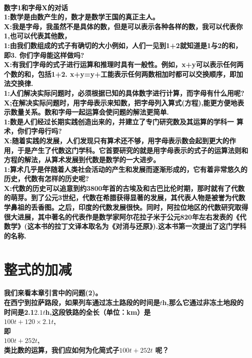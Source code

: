 \documentclass[UTF8]{report}
\theoremstyle{definition}
\theoremstyle{remark}
\begin{document}
\paragraph{数字1和字母X的对话\\1:数学是由数产生的，数才是数学王国的真正主人。\\X:我是字母，我虽然不是具体的数，但是可以表示各种各样的数，我可以代表你1,也可以代表其他数，\\1:由我们数组成的式子有确切的大小例如，人们一见到1+2就知道是1与2的和，即3. 你们字母能这样做吗?\\X:有我们字母的式子进行运算和推理时具有一般性。例如，x+y可以表示任何两个数的和，包括1+2. x+y=y+工能表示任何两数相加时都可以交换顺序，即加法交换律.\\1:人们解决实际问题时，必须根据已知的具体数字进行计算，而字母有什么用呢?X;在解决实际问题时，用字母表示来知数，把字母列入算式(方程),能更方便地表示数量关系。数和字母一起运算会使问题的解法更简单.\\1:数是人们经过长期实践创造出来的，并建立了专门研究数及其运算的学科一 算术，你们字母行吗?\\X:随着实践的发展，人们发现只有算术还不够，用字母表示数会起到更大的作用，于是产生了代数这门学科。它首要研究的就是用字母表示的式子的运算法则和方程的解法，从算术发展到代数是数学的一大进步。\\1:算术几乎是伴随着人类社会活动的产生和发展而逐渐形成的，它有着非常悠久的历史，代数有怎样的历史呢?\\X:代数的历史可以追意到约3800年首的古埃及和古巴比伦时期，那时就有了代数的萌芽。到了公元3世纪，代数在希腊获得显著的发展，其代表人物是被誉为代数学鼻祖的丢香图。之后，印度的代数发展很快。同时，阿拉位地区的代数研究取得很大进展，其中著名的代表作是数学家阿尔花拉子米于公元820年左右发表的《代数学》(这本书的拉丁文译本取名为《对消与还原》).这本书第一次提出了这门学科的名称.}
\section{整式的加减}
\paragraph{我们来看本章引言中的问题(2)。\\在西宁到拉萨路段，如果列车通过冻土路段的时间是$t$h,那么它通过非冻土地段的时间是2.1$2.1t$h,这段铁路的全长（单位：km）是\\$100t+120\times2.1t$,\\ 即\\$100t+252t$,\\ 类比数的运算，我们应如何为化简式子$100t+252t$ 呢？}
\end{document}
